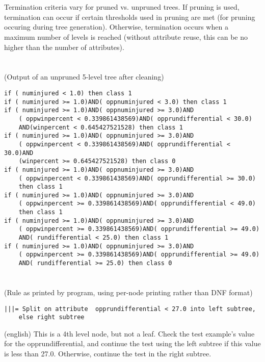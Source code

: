 \documentclass[11pt]{article}
\begin{document}
\section{}

Termination criteria vary for pruned vs. unpruned trees. If pruning is used, termination can occur if certain thresholds used in pruning are met (for pruning occuring during tree generation). Otherwise, termination occurs when a maximum number of levels is reached (without attribute reuse, this can be no higher than the number of attributes).

\section{}

(Output of an unpruned 5-level tree after cleaning)
\begin{lstlisting}
if ( numinjured < 1.0) then class 1
if ( numinjured >= 1.0)AND( oppnuminjured < 3.0) then class 1
if ( numinjured >= 1.0)AND( oppnuminjured >= 3.0)AND
    ( oppwinpercent < 0.339861438569)AND( opprundifferential < 30.0)
    AND(winpercent < 0.645427521528) then class 1
if ( numinjured >= 1.0)AND( oppnuminjured >= 3.0)AND
    ( oppwinpercent < 0.339861438569)AND( opprundifferential < 30.0)AND
    (winpercent >= 0.645427521528) then class 0
if ( numinjured >= 1.0)AND( oppnuminjured >= 3.0)AND
    ( oppwinpercent < 0.339861438569)AND( opprundifferential >= 30.0) 
    then class 1
if ( numinjured >= 1.0)AND( oppnuminjured >= 3.0)AND
    ( oppwinpercent >= 0.339861438569)AND( opprundifferential < 49.0)
    then class 1
if ( numinjured >= 1.0)AND( oppnuminjured >= 3.0)AND
    ( oppwinpercent >= 0.339861438569)AND( opprundifferential >= 49.0)
    AND( rundifferential < 25.0) then class 1
if ( numinjured >= 1.0)AND( oppnuminjured >= 3.0)AND
    ( oppwinpercent >= 0.339861438569)AND( opprundifferential >= 49.0)
    AND( rundifferential >= 25.0) then class 0
\end{lstlisting}

\section{}

(Rule as printed by program, using per-node printing rather than DNF format)
\begin{lstlisting}
|||= Split on attribute  opprundifferential < 27.0 into left subtree,
    else right subtree
\end{lstlisting}
(english)
This is a 4th level node, but not a leaf. Check the test example's value for the opprundifferential, and continue the test using the left subtree if this value is less than 27.0. Otherwise, continue the test in the right subtree.
\end{document}
